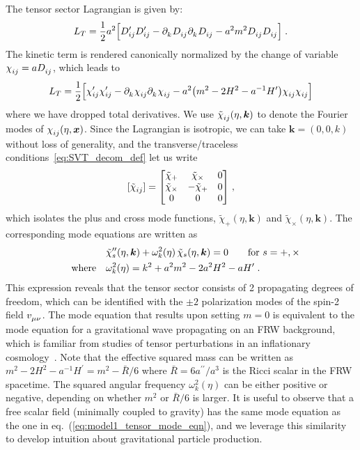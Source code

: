 \documentclass[11pt,a4paper]{article}
\newcommand{\ba}[1]{\begin{align} #1 \end{align}}
\newcommand{\bes}[1]{\begin{equation}\begin{split} #1 \end{split}\end{equation}}
\newcommand{\kvec}{{\bm k}}
\newcommand{\xvec}{{\bm x}}
\newcommand{\LT}{L_T}
\newcommand{\eref}[1]{eq.~(\ref{#1})}
\begin{document}
The tensor sector Lagrangian is given by:
\ba{\label{eq:model1_LT}
    \LT = \frac{1}{2} a^2\Big[D_{ij}^\prime D_{ij}^\prime 
    - \partial\indices{_k} D\indices{_i_j} \partial\indices{_k} D\indices{_i_j}
    - a^2 m^2 D\indices{_i_j}D\indices{_i_j} \Big] 
    \;.
}
The kinetic term is rendered canonically normalized by the change of variable $\chi\indices{_i_j} = a D\indices{_i_j}$, which leads to 
\ba{\label{eq:model1_LT_chi}
    \LT = \frac{1}{2} \Big[\chi_{ij}^\prime \chi_{ij}^\prime 
    - \partial\indices{_k} \chi\indices{_i_j} \partial\indices{_k} \chi\indices{_i_j}
    - a^2 \bigl( m^2 - 2 H^2 - a^{-1} H' \bigr) \chi\indices{_i_j}\chi\indices{_i_j}
    \Big]
}
where we have dropped total derivatives. We use $\tilde\chi\indices{_i_j}(\eta,\kvec)$ to denote the Fourier modes of $\chi\indices{_i_j}(\eta,\xvec)$.  Since the Lagrangian is isotropic, we can take $\kvec = (0,0,k)$ without loss of generality, and the transverse/traceless conditions~\eqref{eq:SVT_decom_def} let us write 
\ba{\label{eq:chi_plus_cross}
    [\tilde{\chi}\indices{_i_j}] 
    = \mqty[\tilde{\chi}_+ & \tilde{\chi}_\times & 0 \\ \tilde{\chi}_\times & - \tilde{\chi}_+ & 0 \\ 0 & 0 & 0] \;,
}
which isolates the plus and cross mode functions, $\tilde{\chi}_+(\eta,\kvec)$ and $\tilde{\chi}_\times(\eta,\kvec)$.  
The corresponding mode equations are written as 
\bes{\label{eq:model1_tensor_mode_eqn}
    & \tilde{\chi}_s^{\prime\prime}(\eta,\kvec) + \omega_k^2(\eta) \, \tilde{\chi}_s(\eta,\kvec) = 0 \qquad \text{for $s=+,\times$} \\
    \qq{where} & \omega_k^2(\eta) = k^2 + a^2 m^2 - 2 a^2 H^2 - a H^\prime 
    \;.
}
This expression reveals that the tensor sector consists of 2 propagating degrees of freedom, which can be identified with the $\pm 2$ polarization modes of the spin-2 field $v\indices{_\mu_\nu}$.  The mode equation that results upon setting $m=0$ is equivalent to the mode equation for a gravitational wave propagating on an FRW background, which is familiar from studies of tensor perturbations in an inflationary cosmology~\cite{Mukhanov:2005,Baumann:2009ds}.  Note that the effective squared mass can be written as $m^2 - 2 H^2 - a^{-1} H^\prime = m^2 - \bar{R}/6$ where $\bar{R} = 6 a^{\prime\prime}/a^3$ is the Ricci scalar in the FRW spacetime.  The squared angular frequency $\omega_k^2(\eta)$ can be either positive or negative, depending on whether $m^2$ or $\bar{R}/6$ is larger.  It is useful to observe that a free scalar field (minimally coupled to gravity) has the same mode equation as the one in \eref{eq:model1_tensor_mode_eqn}, and we leverage this similarity to develop intuition about gravitational particle production. 
\end{document}
